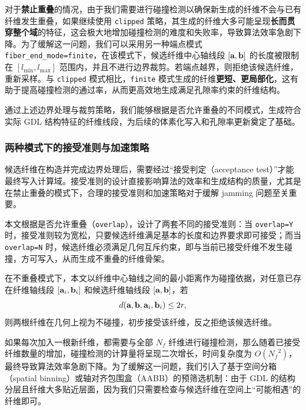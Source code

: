 对于\textbf{禁止重叠}的情况，由于我们需要进行碰撞检测以确保新生成的纤维不会与已有纤维发生重叠，如果继续使用 \texttt{clipped} 策略，其生成的纤维大多可能呈现\textbf{长而贯穿整个域}的特征，这会极大地增加碰撞检测的难度和失败率，导致算法效率急剧下降。为了缓解这一问题，我们可以采用另一种端点模式 \texttt{fiber\_end\_mode=finite}，在该模式下，候选纤维中心轴线段 $[\textbf a, \textbf b]$ 的长度被限制在 $[l_{\min}, l_{\max}]$ 范围内，并且不进行边界裁剪。若端点越界，则拒绝该候选纤维，重新采样。与 \texttt{clipped} 模式相比，\texttt{finite} 模式生成的纤维\textbf{更短、更局部化}，这有助于提高碰撞检测的通过率，从而更高效地生成满足孔隙率约束的纤维结构。

通过上述边界处理与裁剪策略，我们能够根据是否允许重叠的不同模式，生成符合实际 GDL 结构特征的纤维线段，为后续的体素化写入和孔隙率更新奠定了基础。

\subsubsection{\textbf{两种模式下的接受准则与加速策略}}

候选纤维在构造并完成边界处理后，需要经过“接受判定（acceptance test）”才能最终写入计算域。接受准则的设计直接影响算法的效率和生成结构的质量，尤其是在禁止重叠的模式下，合理的接受准则和加速策略对于缓解 jamming 问题至关重要。

本文根据是否允许重叠（\texttt{overlap}），设计了两套不同的接受准则：当 \texttt{overlap=Y} 时，接受准则较为宽松，只要候选纤维满足基本的长度和边界要求即可接受；而当 \texttt{overlap=N} 时，候选纤维必须满足几何互斥约束，即与当前已接受纤维不发生碰撞，方可写入，从而生成不重叠的纤维骨架。

在不重叠模式下，本文以纤维中心轴线之间的最小距离作为碰撞依据，对任意已存在纤维轴线段 $[\textbf a_i,\textbf b_i]$ 和候选纤维轴线段 $[\textbf a, \textbf b]$，若
\begin{equation}
d(\textbf{a}, \textbf{b}, \textbf a_i, \textbf b_i) \le 2r,
\end{equation}
则两根纤维在几何上视为不碰撞，初步接受该纤维，反之拒绝该候选纤维。

如果每次加入一根新纤维，都需要与全部 $N_f$ 纤维进行碰撞检测，那么随着已接受纤维数量的增加，碰撞检测的计算量将呈现二次增长，时间复杂度为 $O({N_f}^2)$，最终导致算法效率急剧下降。为了缓解这一问题，我们引入了基于空间分箱（spatial binning）或轴对齐包围盒（AABB）的预筛选机制：由于 GDL 的结构分层且纤维大多贴近层面，因为我们只需要检查与候选纤维在空间上“可能相遇”的纤维即可。

